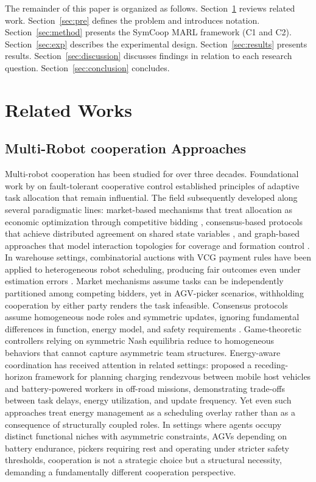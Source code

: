 \documentclass[Afour,sageh,times]{sagej}
\begin{document}
The remainder of this paper is organized as follows. Section~\ref{sec:related} reviews related work. Section~\ref{sec:pre} defines the problem and introduces notation. Section~\ref{sec:method} presents the SymCoop MARL framework (C1 and C2). Section~\ref{sec:exp} describes the experimental design. Section~\ref{sec:results} presents results. Section~\ref{sec:discussion} discusses findings in relation to each research question. Section~\ref{sec:conclusion} concludes.

\section{Related Works}
\label{sec:related}
\subsection{Multi-Robot cooperation Approaches}
Multi-robot cooperation has been studied for over three decades. Foundational work by \citet{parker1998ALLIANCE} on fault-tolerant cooperative control established principles of adaptive task allocation that remain influential. The field subsequently developed along several paradigmatic lines: market-based mechanisms that treat allocation as economic optimization through competitive bidding \citep{gerkey2004formal, dias2006Marketbased}, consensus-based protocols that achieve distributed agreement on shared state variables \citep{olfati-saber2007Consensus, ren2008Consensus, amirkhani2022Consensus}, and graph-based approaches that model interaction topologies for coverage and formation control \citep{cortes2004Coverage, spanos2005Dynamic}. In warehouse settings, combinatorial auctions with VCG payment rules have been applied to heterogeneous robot scheduling, producing fair outcomes even under estimation errors \citep{kattepur2021aspects}. Market mechanisms assume tasks can be independently partitioned among competing bidders, yet in AGV-picker scenarios, withholding cooperation by either party renders the task infeasible. Consensus protocols assume homogeneous node roles and symmetric updates, ignoring fundamental differences in function, energy model, and safety requirements \citep{amirkhani2022Consensus}. Game-theoretic controllers relying on symmetric Nash equilibria \citep{nash1950Equilibrium} reduce to homogeneous behaviors that cannot capture asymmetric team structures. Energy-aware coordination has received attention in related settings: \citet{goulet2025dynamic} proposed a receding-horizon framework for planning charging rendezvous between mobile host vehicles and battery-powered workers in off-road missions, demonstrating trade-offs between task delays, energy utilization, and update frequency. Yet even such approaches treat energy management as a scheduling overlay rather than as a consequence of structurally coupled roles. In settings where agents occupy distinct functional niches with asymmetric constraints, AGVs depending on battery endurance, pickers requiring rest and operating under stricter safety thresholds, cooperation is not a strategic choice but a structural necessity, demanding a fundamentally different cooperation perspective.
\end{document}
